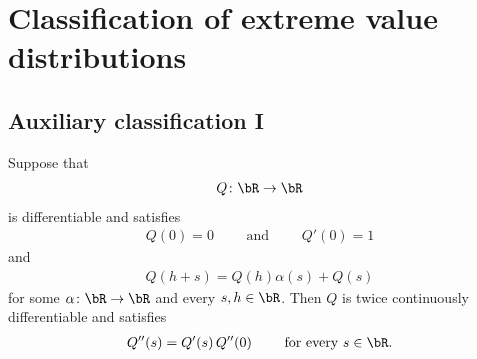\chapter{Classification of extreme value distributions}

\section{Auxiliary classification I}

\begin{lemma}
  \label{lem:ode-of-order-two-for-Q}
  \leanok
  Suppose that
  \begin{align*}
  Q \colon \bR \to \bR
  \end{align*}
  is differentiable and satisfies
  \begin{align*}
  Q(0) = 0 \qquad \text{ and } \qquad Q'(0) = 1
  \end{align*}
  and
  \begin{align*}
  Q(h+s) = Q(h) \alpha(s) + Q(s)
  \end{align*}
  for some $\alpha \colon \bR \to \bR$ and every $s,h \in \bR$.
  Then $Q$ is twice continuously differentiable and satisfies
  \begin{align}
    Q''(s) = Q'(s) \, Q''(0) \qquad \text{ for every } s \in \bR .
  \end{align}
\end{lemma}
